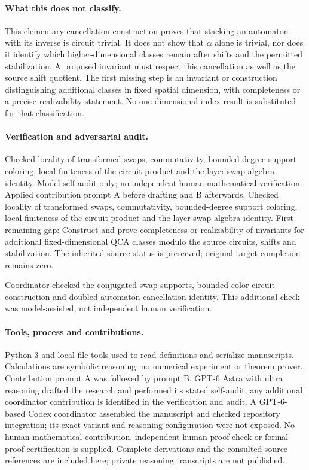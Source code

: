 \documentclass[11pt]{article}
\begin{document}
\paragraph{What this does not classify.} This elementary cancellation construction proves that stacking an automaton with its inverse is circuit trivial. It does not show that \(\alpha\) alone is trivial, nor does it identify which higher-dimensional classes remain after shifts and the permitted stabilization. A proposed invariant must respect this cancellation as well as the source shift quotient. The first missing step is an invariant or construction distinguishing additional classes in fixed spatial dimension, with completeness or a precise realizability statement. No one-dimensional index result is substituted for that classification.

\paragraph{Verification and adversarial audit.}
Checked locality of transformed swaps, commutativity, bounded-degree support coloring, local finiteness of the circuit product and the layer-swap algebra identity. Model self-audit only; no independent human mathematical verification. Applied contribution prompt A before drafting and B afterwards. Checked locality of transformed swaps, commutativity, bounded-degree support coloring, local finiteness of the circuit product and the layer-swap algebra identity. First remaining gap: Construct and prove completeness or realizability of invariants for additional fixed-dimensional QCA classes modulo the source circuits, shifts and stabilization. The inherited source status is preserved; original-target completion remains zero.

Coordinator checked the conjugated swap supports, bounded-color circuit construction and doubled-automaton cancellation identity. This additional check was model-assisted, not independent human verification.

\paragraph{Tools, process and contributions.}
Python 3 and local file tools used to read definitions and serialize manuscripts. Calculations are symbolic reasoning; no numerical experiment or theorem prover. Contribution prompt A was followed by prompt B. GPT-6 Astra with ultra reasoning drafted the research and performed its stated self-audit; any additional coordinator contribution is identified in the verification and audit. A GPT-6-based Codex coordinator assembled the manuscript and checked repository integration; its exact variant and reasoning configuration were not exposed. No human mathematical contribution, independent human proof check or formal proof certification is supplied. Complete derivations and the consulted source references are included here; private reasoning transcripts are not published.
\end{document}
